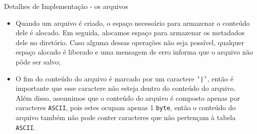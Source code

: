\documentclass[10pt]{beamer}
\begin{document}
    \begin{frame}{Detalhes de Implementação - os arquivos}
        \begin{itemize}
            \justifying
            \item Quando um arquivo é criado, o espaço necessário para armazenar
                o conteúdo dele é alocado. Em seguida, alocamos espaço para
                armazenar os metadados dele no diretório. Caso alguma dessas
                operações não seja possível, qualquer espaço alocado é liberado
                e uma mensagem de erro informa que o arquivo não pôde ser
                salvo;
            \item O fim do conteúdo do arquivo é marcado por um caractere
                \texttt{`|'}, então é importante que esse caractere não esteja
                dentro do conteúdo do arquivo. Além disso, assumimos que o
                conteúdo do arquivo é composto apenas por caracteres
                \texttt{ASCII}, pois estes ocupam apenas 1 \texttt{byte}, então
                o conteúdo do arquivo também não pode conter caracteres que não
                pertençam à tabela \texttt{ASCII}.
        \end{itemize}
    \end{frame}
\end{document}
